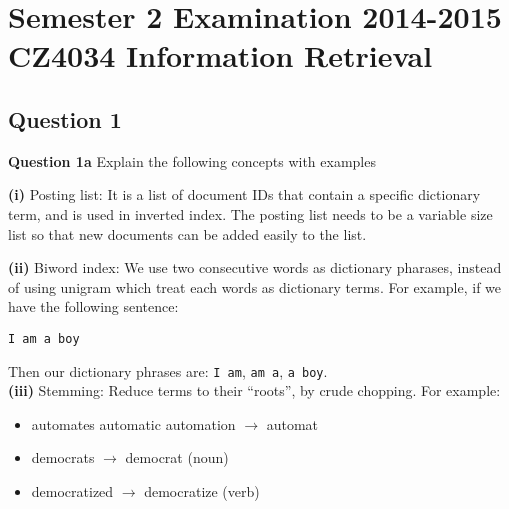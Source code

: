 \documentclass[11pt,a4paper]{report}
\begin{document}
\chapter{Semester 2 Examination 2014-2015\\CZ4034 Information Retrieval}

\begin{multicols*}{2}

\section{Question 1}
\noindent \textbf{Question 1a} Explain the following concepts with examples

\noindent \textbf{(i)} Posting list: It is a list of document IDs that contain a specific dictionary term, and is used in inverted index. The posting list needs to be a variable size list so that new documents can be added easily to the list. 

\begin{center}
\end{center}

\noindent \textbf{(ii)} Biword index: We use two consecutive words as dictionary pharases, instead of using unigram which treat each words as dictionary terms. For example, if we have the following sentence:
\begin{center}
\verb|I am a boy|
\end{center}
\noindent Then our dictionary phrases are: \verb|I am|, \verb|am a|, \verb|a boy|. \\

\noindent \textbf{(iii)} Stemming: Reduce terms to their “roots”, by crude chopping. For example:
\begin{itemize}
    \item automates automatic automation $\rightarrow$ automat
    \item democrats $\rightarrow$ democrat (noun)
    \item democratized $\rightarrow$ democratize (verb)
\end{itemize} 


\end{multicols*}
\end{document}
